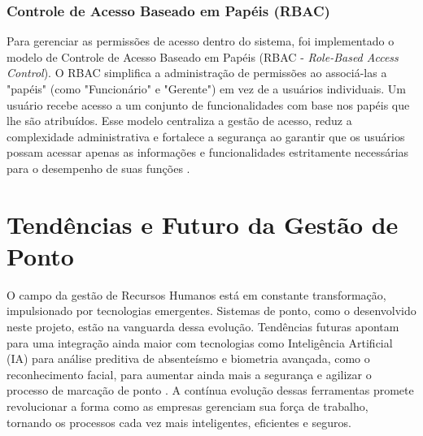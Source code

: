 \subsubsection{Controle de Acesso Baseado em Papéis (RBAC)}
\par Para gerenciar as permissões de acesso dentro do sistema, foi implementado o modelo de Controle de Acesso Baseado em Papéis (RBAC - \textit{Role-Based Access Control}). O RBAC simplifica a administração de permissões ao associá-las a "papéis" (como "Funcionário" e "Gerente") em vez de a usuários individuais. Um usuário recebe acesso a um conjunto de funcionalidades com base nos papéis que lhe são atribuídos. Esse modelo centraliza a gestão de acesso, reduz a complexidade administrativa e fortalece a segurança ao garantir que os usuários possam acessar apenas as informações e funcionalidades estritamente necessárias para o desempenho de suas funções \cite{RBAC_IBM}.

\section{Tendências e Futuro da Gestão de Ponto}
\par O campo da gestão de Recursos Humanos está em constante transformação, impulsionado por tecnologias emergentes. Sistemas de ponto, como o desenvolvido neste projeto, estão na vanguarda dessa evolução. Tendências futuras apontam para uma integração ainda maior com tecnologias como Inteligência Artificial (IA) para análise preditiva de absenteísmo e biometria avançada, como o reconhecimento facial, para aumentar ainda mais a segurança e agilizar o processo de marcação de ponto \cite{ReconhecimentoFacialPonto, TendenciasRH2025}. A contínua evolução dessas ferramentas promete revolucionar a forma como as empresas gerenciam sua força de trabalho, tornando os processos cada vez mais inteligentes, eficientes e seguros.
